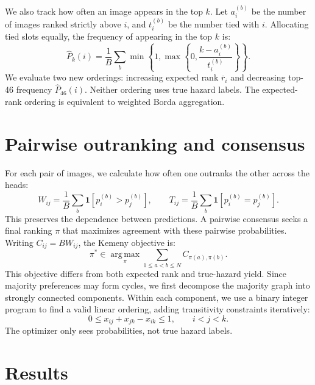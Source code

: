 \documentclass[10pt,a4paper]{article}
\newcommand{\ind}{\mathbf{1}}
\begin{document}
We also track how often an image appears in the top $k$. Let $a_i^{(b)}$ be the number of images ranked strictly above $i$, and $t_i^{(b)}$ be the number tied with $i$. Allocating tied slots equally, the frequency of appearing in the top $k$ is:
\begin{equation}
\widehat P_k(i)=\frac{1}{B}\sum_b
\min\!\left\{1,\max\!\left\{0,\frac{k-a_i^{(b)}}{t_i^{(b)}}\right\}\right\}.
\end{equation}
We evaluate two new orderings: increasing expected rank $\overline r_i$ and decreasing top-46 frequency $\widehat P_{46}(i)$. Neither ordering uses true hazard labels. The expected-rank ordering is equivalent to weighted Borda aggregation.

\section{Pairwise outranking and consensus}
\label{sec:pairwise}
For each pair of images, we calculate how often one outranks the other across the heads:
\begin{equation}
W_{ij}=\frac{1}{B}\sum_b\ind[p_i^{(b)}>p_j^{(b)}],\qquad
T_{ij}=\frac{1}{B}\sum_b\ind[p_i^{(b)}=p_j^{(b)}].
\end{equation}
This preserves the dependence between predictions. A pairwise consensus seeks a final ranking $\pi$ that maximizes agreement with these pairwise probabilities. Writing $C_{ij}=BW_{ij}$, the Kemeny objective is:
\begin{equation}
\pi^*\in\operatorname*{arg\,max}_{\pi}
\sum_{1\leq a<b\leq N}C_{\pi(a),\pi(b)}.
\label{eq:objective}
\end{equation}
This objective differs from both expected rank and true-hazard yield. Since majority preferences may form cycles, we first decompose the majority graph into strongly connected components. Within each component, we use a binary integer program to find a valid linear ordering, adding transitivity constraints iteratively:
\begin{equation}
0\leq x_{ij}+x_{jk}-x_{ik}\leq1,\qquad i<j<k.
\end{equation}
The optimizer only sees probabilities, not true hazard labels.

\section{Results}
\label{sec:results}
\end{document}

